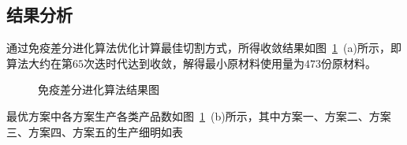 \documentclass{whutmod}
\begin{document}
    \subsection{结果分析}
    通过免疫差分进化算法优化计算最佳切割方式，所得收敛结果如图~\ref{asdmsd}~(a)所示，即算法大约在第$65$次迭时代达到收敛，解得最小原材料使用量为$473$份原材料。
    	\begin{figure}[H]
    	\centering
    	\label{asdmd}
    	\caption{免疫差分进化算法结果图}\label{asdmsd}
    \end{figure}
    最优方案中各方案生产各类产品数如图~\ref{asdmsd}~(b)所示，其中方案一、方案二、方案三、方案四、方案五的生产细明如表
\end{document}

